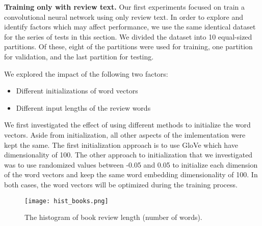 \documentclass[conference,compsoc]{IEEEtran}
\begin{document}
\textbf{Training only with review text.} Our first experiments focused on train a convolutional neural network using only review text. In order to explore and identify factors which may affect performance, we use the same identical dataset for the series of tests in this section. We divided the dataset into 10 equal-sized partitions. Of these, eight of the partitions were used for training, one partition for validation, and the last partition for testing.

We explored the impact of the following two factors:
\begin{itemize}
\item Different initializations of word vectors
\item Different input lengths of the review words
\end{itemize}
We first investigated the effect of using different methods to initialize the word vectors. Aside from initialization, all other aspects of the imlementation were kept the same. The first initialization approach is to use GloVe which have dimensionality of 100. %
The other approach to initialization that we investigated was to use randomized values between -0.05 and 0.05 to initialize each dimension of the word vectors and keep the same word embedding dimensionality of 100. In both cases, the word vectors will be optimized during the training process.
\begin{figure}[t]
	\graphicspath{ {./figures/} }
	\centering
	\texttt{[image: hist\_books.png]}
	\caption{The histogram of book review length (number of words).}
	\label{fig:hist_length}
\end{figure}%
\end{document}
